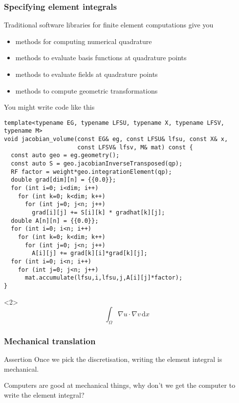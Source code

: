 \documentclass[presentation]{beamer}
\begin{document}
\begin{frame}
  \frametitle{Specifying element integrals}

  Traditional software libraries for finite element computations give you
  \begin{itemize}
  \item methods for computing numerical quadrature
  \item methods to evaluate basis functions at quadrature points
  \item methods to evaluate fields at quadrature points
  \item methods to compute geometric transformations
  \end{itemize}
\end{frame}
\begin{frame}[fragile]
  You might write code like this
\begin{verbatim}
template<typename EG, typename LFSU, typename X, typename LFSV, typename M>
void jacobian_volume(const EG& eg, const LFSU& lfsu, const X& x,
                     const LFSV& lfsv, M& mat) const {
  const auto geo = eg.geometry();
  const auto S = geo.jacobianInverseTransposed(qp);
  RF factor = weight*geo.integrationElement(qp);
  double grad[dim][n] = {{0.0}};
  for (int i=0; i<dim; i++)
    for (int k=0; k<dim; k++)
      for (int j=0; j<n; j++)
        grad[i][j] += S[i][k] * gradhat[k][j];
  double A[n][n] = {{0.0}};
  for (int i=0; i<n; i++)
    for (int k=0; k<dim; k++)
      for (int j=0; j<n; j++)
        A[i][j] += grad[k][i]*grad[k][j];
  for (int i=0; i<n; i++)
    for (int j=0; j<n; j++)
      mat.accumulate(lfsu,i,lfsu,j,A[i][j]*factor);
}
\end{verbatim}
  \begin{uncoverenv}<2>
    \begin{equation*}
      \int_\Omega \nabla u \cdot \nabla v\,\text{d}x
    \end{equation*}
  \end{uncoverenv}
\end{frame}

\begin{frame}
  \frametitle{Mechanical translation}
  \begin{block}{Assertion}
    Once we pick the discretisation, writing the element integral is mechanical.
  \end{block}
  \begin{corollary}
    Computers are good at mechanical things, why don't we get the
    computer to write the element integral?
  \end{corollary}
\end{frame}
\end{document}
